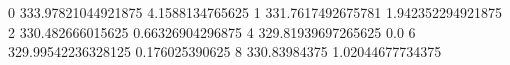 0 333.97821044921875 4.1588134765625
1 331.7617492675781 1.942352294921875
2 330.482666015625 0.66326904296875
4 329.81939697265625 0.0
6 329.99542236328125 0.176025390625
8 330.83984375 1.02044677734375
